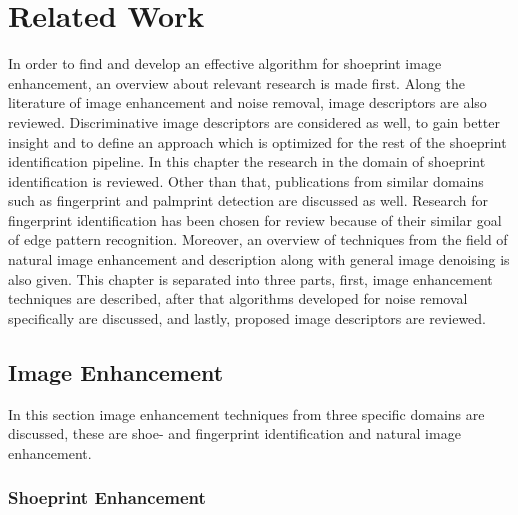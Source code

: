\documentclass[draft,final]{vutinfth} %
\begin{document}
\chapter{Related Work}
\par
In order to find and develop an effective algorithm for shoeprint image enhancement, an overview about relevant research is made first.
Along the literature of image enhancement and noise removal, image descriptors are also reviewed.
Discriminative image descriptors are considered as well, to gain better insight and to define an approach which is optimized for the rest of the shoeprint identification pipeline.
In this chapter the research in the domain of shoeprint identification is reviewed.
Other than that, publications from similar domains such as fingerprint and palmprint detection are discussed as well.
Research for fingerprint identification has been chosen for review because of their similar goal of edge pattern recognition.
Moreover, an overview of techniques from the field of natural image enhancement and description along with general image denoising is also given.
This chapter is separated into three parts, first, image enhancement techniques are described, after that algorithms developed for noise removal specifically are discussed, and lastly, proposed image descriptors are reviewed.

\section{Image Enhancement}
\label{sec:rw:ImageENhancement}

In this section image enhancement techniques from three specific domains are discussed, these are shoe- and fingerprint identification and natural image enhancement.

\subsection{Shoeprint Enhancement}
\end{document}
